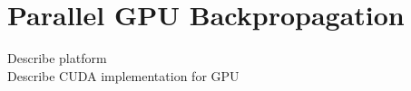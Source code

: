 \section{Parallel GPU Backpropagation}
\label{GPUBackProp}

Describe platform \\
Describe CUDA implementation for GPU